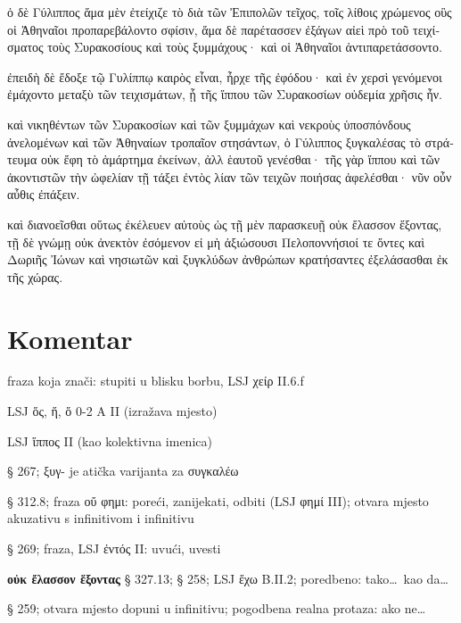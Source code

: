 {\large

\begin{greek}

\noindent ὁ δὲ Γύλιππος ἅμα μὲν ἐτείχιζε τὸ διὰ τῶν Ἐπιπολῶν τεῖχος, τοῖς λίθοις χρώμενος οὓς οἱ Ἀθηναῖοι προπαρεβάλοντο σφίσιν, ἅμα δὲ παρέτασσεν ἐξάγων αἰεὶ πρὸ τοῦ τειχίσματος τοὺς Συρακοσίους καὶ τοὺς ξυμμάχους· καὶ οἱ Ἀθηναῖοι ἀντιπαρετάσσοντο.

ἐπειδὴ δὲ ἔδοξε τῷ Γυλίππῳ καιρὸς εἶναι, ἦρχε τῆς ἐφόδου· καὶ ἐν χερσὶ γενόμενοι ἐμάχοντο μεταξὺ τῶν τειχισμάτων, ᾗ τῆς ἵππου τῶν Συρακοσίων οὐδεμία χρῆσις ἦν.

καὶ νικηθέντων τῶν Συρακοσίων καὶ τῶν ξυμμάχων καὶ νεκροὺς ὑποσπόνδους ἀνελομένων καὶ τῶν Ἀθηναίων τροπαῖον στησάντων, ὁ Γύλιππος ξυγκαλέσας τὸ στράτευμα οὐκ ἔφη τὸ ἁμάρτημα ἐκείνων, ἀλλ ἑαυτοῦ γενέσθαι· τῆς γὰρ ἵππου καὶ τῶν ἀκοντιστῶν τὴν ὠφελίαν τῇ τάξει ἐντὸς λίαν τῶν τειχῶν ποιήσας ἀφελέσθαι· νῦν οὖν αὖθις ἐπάξειν.

καὶ διανοεῖσθαι οὕτως ἐκέλευεν αὐτοὺς ὡς τῇ μὲν παρασκευῇ οὐκ ἔλασσον ἕξοντας, τῇ δὲ γνώμῃ οὐκ ἀνεκτὸν ἐσόμενον εἰ μὴ ἀξιώσουσι Πελοποννήσιοί τε ὄντες καὶ Δωριῆς Ἰώνων καὶ νησιωτῶν καὶ ξυγκλύδων ἀνθρώπων κρατήσαντες ἐξελάσασθαι ἐκ τῆς χώρας.

\end{greek}

}


\section*{Komentar}



\begin{description}[noitemsep]
\item[ἐν χερσὶ γενόμενοι] fraza koja znači: stupiti u blisku borbu, LSJ χείρ II.6.f
\item[ᾗ] LSJ ὅς, ἥ, ὅ 0-2 A II (izražava mjesto)
\item[τῆς ἵππου] LSJ ἵππος II (kao kolektivna imenica)
\end{description}


\begin{description}[noitemsep]
\item[ξυγκαλέσας] § 267; ξυγ- je atička varijanta za συγκαλέω
\item[οὐκ ἔφη] § 312.8; fraza οὔ φημι: poreći, zanijekati, odbiti (LSJ φημί III); otvara mjesto akuzativu s infinitivom i infinitivu
\item[ἐντὸς\dots\ ποιήσας] § 269; fraza, LSJ ἐντός II: uvući, uvesti%
\end{description}


\begin{description}[noitemsep]
\item[οὕτως\dots\ ὡς\dots] \textbf{οὐκ ἔλασσον ἕξοντας} § 327.13; § 258; LSJ ἔχω B.II.2; poredbeno: tako\dots\ kao da\dots%
\item[εἰ μὴ ἀξιώσουσι] § 259; otvara mjesto dopuni u infinitivu; pogodbena realna protaza: ako ne\dots
\end{description}


